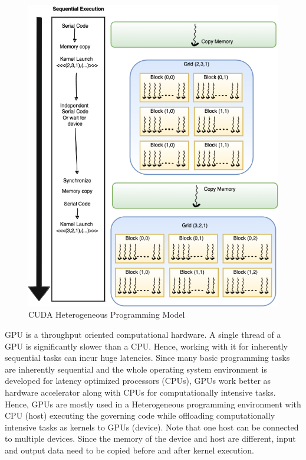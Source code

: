\begin{figure}[ht]
\begin{minipage}{0.28\textwidth}
    \end{minipage}
    \begin{minipage}{0.6\textwidth}
        \includegraphics[width=\textwidth]{fig/heterogeneous-programming.png}
    \end{minipage}
    \caption{CUDA Heterogeneous Programming Model}
    \label{fig:Heterogenous-Programming}
\end{figure}
GPU is a throughput oriented computational hardware.
A single thread of a GPU is significantly slower than a CPU. Hence, working with it for inherently sequential tasks can incur huge latencies.
Since many basic programming tasks are inherently sequential and the whole operating system environment is developed for latency optimized processors (CPUs), GPUs work better as hardware accelerator along with CPUs for computationally intensive tasks.
Hence, GPUs are mostly used in a Heterogeneous programming environment with CPU (host) executing the governing code while offloading computationally intensive tasks as kernels to GPUs (device).
Note that one host can be connected to multiple devices.
Since the memory of the device and host are different, input and output data need to be copied before and after kernel execution.
